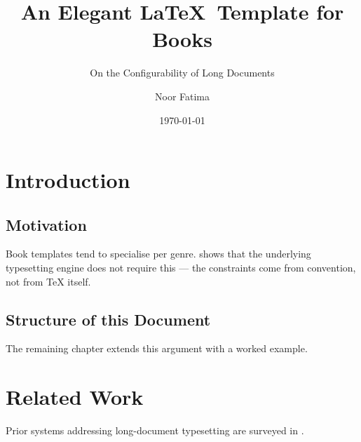 \documentclass[11pt,bibtex]{elegantbook}
\title{An Elegant \LaTeX\ Template for Books}
\subtitle{On the Configurability of Long Documents}
\author{Noor Fatima}
\institute{Elegant\LaTeX\ Program}
\date{\today}
\begin{document}
\maketitle

\frontmatter
\tableofcontents

\mainmatter

\chapter{Introduction}
\section{Motivation}
Book templates tend to specialise per genre. \textcite{knuth1984texbook} shows
that the underlying typesetting engine does not require this — the
constraints come from convention, not from \TeX{} itself.

\section{Structure of this Document}
The remaining chapter extends this argument with a worked example.

\chapter{Related Work}
Prior systems addressing long-document typesetting are surveyed in
\textcite{knuth1984texbook}.

\printbibliography
\end{document}
